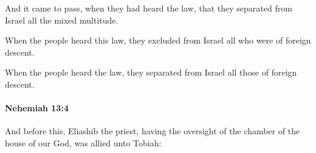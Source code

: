			\begin{versebox}
					\item[BHS] 
					\item[LXX] 
					\item[ASV] And it came to pass, when they had heard the law, that they separated from Israel all the mixed multitude.
					\item[NIV] When the people heard this law, they excluded from Israel all who were of foreign descent.
					\item[NRSV] When the people heard the law, they separated from Israel all those of foreign descent.
			\end{versebox}

		\paragraph{Nehemiah 13:4} %
			\label{NEHEMIAH-13-4}

			And before this, Eliashib the priest, having the oversight of the chamber of the house of our God, was allied unto Tobiah:

